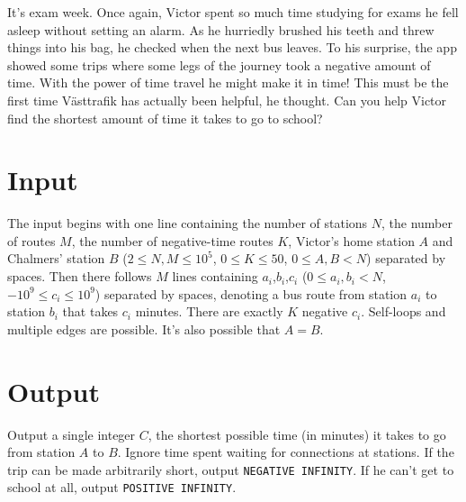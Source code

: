 
It's exam week. Once again, Victor spent so much time studying for exams he fell asleep without
setting an alarm. As he hurriedly brushed his teeth and threw things into his bag, he checked when
the next bus leaves. To his surprise, the app showed some trips where some legs of the journey took
a negative amount of time. With the power of time travel he might make it in time! This must be the
first time Västtrafik has actually been helpful, he thought. Can you help Victor find the shortest
amount of time it takes to go to school?

\section*{Input}

The input begins with one line containing the number of stations $N$, the number of routes $M$, the
number of negative-time routes $K$, Victor's home station $A$ and Chalmers' station $B$ ($2\le
N,M\le 10^5$, $0\le K\le 50$, $0\le A,B< N$) separated by spaces. Then there follows $M$ lines
containing $a_i$,$b_i$,$c_i$ ($0\le a_i,b_i<N$, $-10^9\le c_i\le 10^9$) separated by spaces,
denoting a bus route from station $a_i$ to station $b_i$ that takes $c_i$ minutes. There are
exactly $K$ negative $c_i$. Self-loops and multiple edges are possible. It's also possible that $A=B$.

\section*{Output}

Output a single integer $C$, the shortest possible time (in minutes) it takes to go from station $A$
to $B$. Ignore time spent waiting for connections at stations. If the trip can be made arbitrarily
short, output \texttt{NEGATIVE INFINITY}. If he can't get to school at all, output \texttt{POSITIVE INFINITY}.
